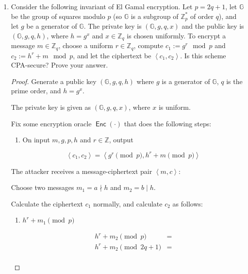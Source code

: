 \documentclass{article}
\DeclareMathOperator{\Enc}{\textsf{Enc}}
\begin{document}
\begin{enumerate}
  \item Consider the following invariant of El Gamal encryption. Let $p = 2q +
    1$, let $\mathbb{G}$ be the group of squares modulo $p$ (so $\mathbb{G}$
    is a subgroup of $\mathbb{Z}^{*}_p$ of order $q$), and let $g$ be a
    generator of $\mathbb{G}$. The private key is $(\mathbb{G}, g, q, x)$ and
    the public key is $(\mathbb{G}, g, q, h)$, where $h = g^x$ and $x \in
    \mathbb{Z}_q$ is chosen uniformly. To encrypt a message $m \in
    \mathbb{Z}_q$, choose a uniform $r \in \mathbb{Z}_q$, compute $c_1 := g^r
    \mod p$ and $c_2 := h^r + m \mod p$, and let the ciphertext be $\left<c_1,
    c_2\right>$. Is this scheme CPA-secure? Prove your answer.

    \begin{proof}
      Generate a public key $(\mathbb{G}, g, q, h)$ where $g$ is a generator of
      $\mathbb{G}$, $q$ is the prime order, and $h = g^x$.

      The private key is given as $(\mathbb{G}, g, q, x)$, where $x$ is uniform.

      Fix some encryption oracle $\Enc(\cdot)$ that does the following steps:
      \begin{enumerate}
        \item On input $m, g, p, h$ and $r \in \mathbb{Z}$, output

          \[
            \left<c_1, c_2\right> = \left<g^r \pmod{p}, h^r + m \pmod{p}\right>
          \]
      \end{enumerate}

      The attacker receives a message-ciphertext pair $\left<m, c\right>$:

      Choose two messages $m_1 = a \nmid h$ and $m_2 = b \mid h$.

      Calculate the ciphertext $c_1$ normally, and calculate $c_2$ as follows:
      \begin{enumerate}
        \item $h^r + m_1 \pmod{p}$

          \begin{align*}
            h^r + m_2 \pmod{p} &=\\
            h^r + m_2 \pmod{2q + 1} &=\\
          \end{align*}
      \end{enumerate}
    \end{proof}


\end{enumerate}
\end{document}

